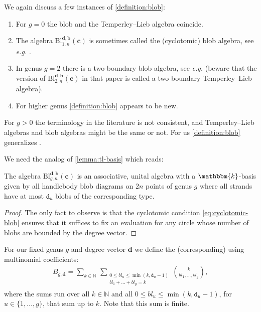 \documentclass[a4paper,11pt]{amsart}
\let\emph\relax
\newcommand{\eg}{\textsl{e.g.}}
\renewcommand{\dots}{\text{...}}
\newcommand{\setstuff}[1]{\mathrm{#1}}
\newcommand{\KK}{\mathbbm{k}}
\newcommand{\N}{\mathbb{N}}
\newcommand{\bsym}[1]{\boldsymbol{#1}}
\newcommand{\varsym}[1]{\mathtt{#1}}
\newcommand{\cpar}{\bsym{c}}
\newcommand{\bpar}{\bsym{b}}
\newcommand{\dpar}{\bsym{d}}
\newcommand{\dvar}{\varsym{d}}
\numberwithin{equation}{section}
\let\fullref\autoref
\begin{document}
\begin{remark}\label{remark:blob}
We again discuss a few instances of \fullref{definition:blob}:
\begin{enumerate}

\setlength\itemsep{0.15cm}

\item For $g=0$ the blob and the Temperley--Lieb algebra 
coincide.

\item The algebra $\setstuff{Bl}_{1,n}^{\dpar,\bpar}(\cpar)$ 
is sometimes called the (cyclotomic) blob algebra, see {\eg} \cite{MaSa-blob}.

\item In genus $g=2$ there is a two-boundary 
blob algebra, see {\eg} 
\cite{deGiNi-two-boundary-tl} (beware that the version of $\setstuff{Bl}_{2,n}^{\dpar,\bpar}(\cpar)$ 
in that paper is called a two-boundary 
Temperley--Lieb algebra).

\item For higher genus \fullref{definition:blob} appears to be new.

\end{enumerate}
For $g>0$
the terminology in the literature is not consistent, and 
Temperley--Lieb algebras and blob algebras might 
be the same or not. For us \fullref{definition:blob} 
generalizes \cite{MaSa-blob}.
\end{remark}

We need the 
analog of \fullref{lemma:tl-basis} which reads:

\begin{lemma}\label{lemma:blob-basis}
The algebra 
$\setstuff{Bl}_{g,n}^{\dpar,\bpar}(\cpar)$ is an associative, unital 
algebra with a $\KK$-basis given by all handlebody blob diagrams 
on $2n$ points of genus 
$g$ where all strands have at most $\dvar_{u}$ 
blobs of the corresponding type.
\end{lemma}

\begin{proof}
The only fact to observe is that 
the cyclotomic condition \eqref{eq:cyclotomic-blob} 
ensures that it suffices to 
fix an evaluation for any circle whose number of blobs are bounded 
by the degree vector.
\end{proof}

For our fixed genus $g$ and degree vector $\dpar$ we define 
the (corresponding) \emph{blob numbers} using multinomial
coefficients:
\begin{gather}\label{eq:blob-numbers}
B_{g,\dpar}=
\sum_{k\in\N}\,
\sum_{\substack{0\leq bl_{u}\leq\min(k,\dvar_{u}-1)\\bl_{1}+\dots+bl_{g}=k}}
\binom{k}{bl_{1},\dots,bl_{g}},
\end{gather}
where the sums run over all $k\in\N$ and all 
$0\leq bl_{u}\leq\min(k,\dvar_{u}-1)$,
for $u\in\{1,\dots,g\}$, that sum up to $k$.
Note that this sum is finite.
\end{document}
